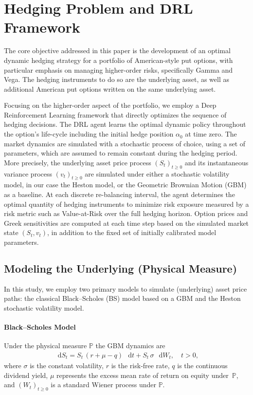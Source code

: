 \documentclass[a4paper,fleqn]{cas-dc}
\newcommand*\D{\mathop{}\!\mathrm{d}}
\begin{document}
\section{Hedging Problem and DRL Framework}
\label{sec:framework}

The core objective addressed in this paper is the development of an optimal dynamic hedging strategy for a portfolio of American-style put options, with particular emphasis on managing higher-order risks, specifically Gamma and Vega. The hedging instruments to do so are the underlying asset, as well as additional American put options written on the same underlying asset. 

Focusing on the higher-order aspect of the portfolio, we employ a Deep Reinforcement Learning framework that directly optimizes the sequence of hedging decisions. The DRL agent learns the optimal dynamic policy throughout the option's life-cycle including the initial hedge position $\alpha_0$ at time zero. The market dynamics are simulated with a stochastic process of choice, using a set of parameters, which are assumed to remain constant during the hedging period. More precisely, the underlying asset price process $(S_t)_{t \geq 0}$ and its instantaneous variance process $(v_t)_{t \geq 0}$ are simulated under either a stochastic volatility model, in our case the Heston model, or the Geometric Brownian Motion (GBM) as a baseline. At each discrete re-balancing interval, the agent determines the optimal quantity of hedging instruments to minimize risk exposure measured by a risk metric such as Value-at-Risk over the full hedging horizon. Option prices and Greek sensitivities are computed at each time step based on the simulated market state $(S_t, v_t)$, in addition to the fixed set of initially calibrated model parameters.


\subsection{Modeling the Underlying (Physical Measure)}
\label{sec:ModelAssumptions}
In this study, we employ two primary models to simulate (underlying) asset price paths: the classical Black–Scholes (BS) model based on a GBM and the Heston stochastic volatility model. 

\paragraph{Black–Scholes Model}
Under the physical measure $\mathbb{P}$ the GBM dynamics are
\begin{align*}
\D S_t = S_t\,(r+\mu - q)\,\D t + S_t\,\sigma\,\D W_t, \quad t>0,
\end{align*}
where $\sigma$ is the constant volatility, $r$ is the risk‑free rate, $q$ is the continuous dividend yield, $\mu$ represents the excess mean rate of return on equity under~$\mathbb{P}$, and $(W_t)_{t\ge 0}$ is a standard Wiener process under $\mathbb{P}$.
\end{document}
